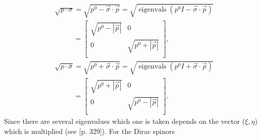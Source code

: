\begin{equation}
	\begin{split}
		&\sqrt{p\cdot \sigma}=\sqrt{p^0-\vec{\sigma}\cdot\vec{p}}=\sqrt{\operatorname{eigenvals}(p^0I-\vec{\sigma}\cdot\vec{p})}\\
		&\qquad \,\,\,\, =\begin{bmatrix}
			\sqrt{p^0-|\vec{p}|} & 0 \\
			0 & \sqrt{p^0+|\vec{p}|}\\
		\end{bmatrix},\\
		&\sqrt{p\cdot \bar{\sigma}}=\sqrt{p^0+\vec{\sigma}\cdot\vec{p}}=\sqrt{\operatorname{eigenvals}(p^0I+\vec{\sigma}\cdot\vec{p})}\\
		&\qquad \,\,\,\, =\begin{bmatrix}
			\sqrt{p^0+|\vec{p}|} & 0 \\
			0 & \sqrt{p^0-|\vec{p}|}\\
		\end{bmatrix}.
	\end{split}
\end{equation} 
Since there are several eigenvalues which one is taken depends on the vector ($\xi,\eta$) which is multiplied (see \citealt{Lancaster2014}[p. 329]). For the Dirac spinors
